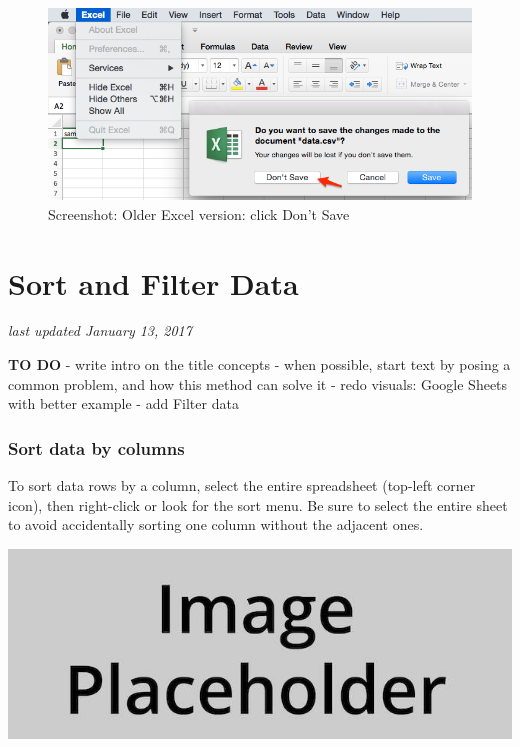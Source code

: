 \documentclass[
  english,
]{book}
\begin{document}
\begin{figure}
\centering
\includegraphics{images/02-spreadsheet/excel-quit-csv.png}
\caption{Screenshot: Older Excel version: click Don't Save}
\end{figure}

\hypertarget{sort}{%
\section{Sort and Filter Data}\label{sort}}

\emph{last updated January 13, 2017}

\textbf{TO DO}
- write intro on the title concepts
- when possible, start text by posing a common problem, and how this method can solve it
- redo visuals: Google Sheets with better example
- add Filter data

\hypertarget{sort-data-by-columns}{%
\subsubsection*{Sort data by columns}\label{sort-data-by-columns}}

To sort data rows by a column, select the entire spreadsheet (top-left corner icon), then right-click or look for the sort menu. Be sure to select the entire sheet to avoid accidentally sorting one column without the adjacent ones.

\includegraphics{images/placeholder.jpg}
\end{document}
